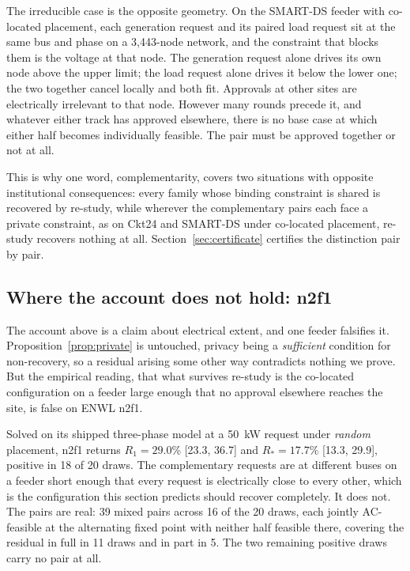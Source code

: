 \documentclass[review,authoryear,12pt]{elsarticle}
\begin{document}
The irreducible case is the opposite geometry. On the SMART-DS feeder with
co-located placement, each generation request and its paired load request sit
at the same bus and phase on a 3{,}443-node network, and the constraint that
blocks them is the voltage at that node. The generation request alone drives
its own node above the upper limit; the load request alone drives it below the
lower one; the two together cancel locally and both fit. Approvals at other
sites are electrically irrelevant to that node. However many rounds precede it,
and whatever either track has approved elsewhere, there is no base case at which
either half becomes individually feasible. The pair must be approved together
or not at all.

This is why one word, complementarity, covers two situations with opposite
institutional consequences: every family whose binding constraint is shared is
recovered by re-study, while wherever the complementary pairs each face a
private constraint, as on Ckt24 and SMART-DS under co-located placement,
re-study recovers nothing at all. Section~\ref{sec:certificate} certifies the
distinction pair by pair.

\subsection{Where the account does not hold: n2f1}
\label{sec:extent-exception}

The account above is a claim about electrical extent, and one feeder falsifies
it. Proposition~\ref{prop:private} is untouched, privacy being a
\emph{sufficient} condition for non-recovery, so a residual arising some other
way contradicts nothing we prove. But the empirical reading, that what
survives re-study is the co-located configuration on a feeder large enough that
no approval elsewhere reaches the site, is false on ENWL n2f1.

Solved on its shipped three-phase model at a 50~kW request under \emph{random}
placement, n2f1 returns $R_{1} = 29.0\%$ [23.3, 36.7] and
$R_{\ast} = 17.7\%$ [13.3, 29.9], positive in 18 of 20 draws. The complementary
requests are at different buses on a
feeder short enough that every request is electrically close to every other,
which is the configuration this section predicts should recover completely. It
does not. The pairs are real: 39 mixed pairs across 16 of the 20 draws, each
jointly AC-feasible at the alternating fixed point with neither half feasible
there, covering the residual in full in 11 draws and in part in 5. The two
remaining positive draws carry no pair at all.
\end{document}
